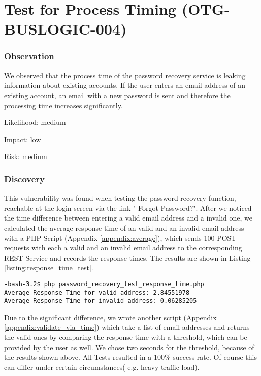 \chapter{Test for Process Timing (OTG-BUSLOGIC-004)}
\subsection{Observation}
	We observed that the process time of the password recovery service is leaking information about existing accounts.
	If the user enters an email address of an existing account, an email with a new password is sent and therefore the processing time increases significantly.


Likelihood: medium \newline

Impact: low\newline

Risk: medium\newline

\subsection{Discovery}
This vulnerability was found when testing the password recovery function, reachable at the login screen via the link " Forgot Password?".
After we noticed the time difference between entering a valid email address and a invalid one, we calculated the average response time of an valid and an invalid email address with a PHP Script (Appendix \ref{appendix:average}), which sends  100 POST requests with each a valid and an invalid email address to the corresponding REST Service and records the response times. The results are shown in Listing \ref{listing:response_time_test}.

\begin{lstlisting}[caption= Results of Testing Respone Time of Password Receovery ,label=listing:response_time_test]
-bash-3.2$ php password_recovery_test_response_time.php 
Average Response Time for valid address: 2.84551978
Average Response Time for invalid address: 0.06285205
\end{lstlisting}

Due to the significant difference, we wrote another script (Appendix \ref{appendix:validate_via_time}) which take a list of email addresses and returns the valid ones by comparing the response time with a threshold, which can be provided by the user as well. We chose two seconds for the threshold, because of the results shown above. All Tests resulted in a 100\% success rate. Of course this can differ under certain circumstances( e.g. heavy traffic load). 

